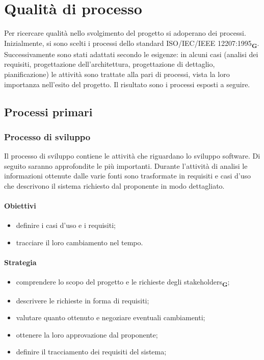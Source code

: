 \section{Qualità di processo}
Per ricercare qualità nello svolgimento del progetto si adoperano dei processi. Inizialmente, si sono scelti i processi dello standard ISO/IEC/IEEE 12207:1995\textsubscript{\textbf{G}}.
Successivamente sono stati adattati secondo le esigenze: in alcuni casi (analisi dei requisiti,
progettazione dell’architettura, progettazione di dettaglio, pianificazione) le attività sono trattate
alla pari di processi, vista la loro importanza nell’esito del progetto.
Il risultato sono i processi esposti a seguire.
\subsection{Processi primari}
\subsubsection{Processo di sviluppo}
Il processo di sviluppo contiene le attività che riguardano lo sviluppo software. Di seguito saranno approfondite le più importanti.
Durante l'attività di analisi le informazioni ottenute dalle varie fonti sono trasformate in requisiti e casi d'uso che descrivono il sistema richiesto
dal proponente in modo dettagliato.
\paragraph{Obiettivi}
\begin{itemize}
    \item definire i casi d'uso e i requisiti;
    \item tracciare il loro cambiamento nel tempo.
\end{itemize}
\paragraph{Strategia}
\begin{itemize}
    \item comprendere lo scopo del progetto e le richieste degli stakeholders\textsubscript{\textbf{G}};
    \item descrivere le richieste in forma di requisiti;
    \item valutare quanto ottenuto e negoziare eventuali cambiamenti;
    \item ottenere la loro approvazione dal proponente;
    \item definire il tracciamento dei requisiti del sistema;
\end{itemize}
